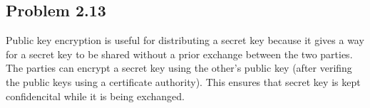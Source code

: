 \documentclass[12pt]{article}
\begin{document}
\subsection{Problem  2.13 \cite[p.~68]{stallings}}
Public key encryption is useful for distributing a secret key because it gives a way for a secret key to be shared without a prior exchange between the two parties. The parties can encrypt a secret key using the other's public key (after verifing the public keys using a certificate authority). This ensures that secret key is kept confidencital while it is being exchanged.


\newpage




\end{document}
